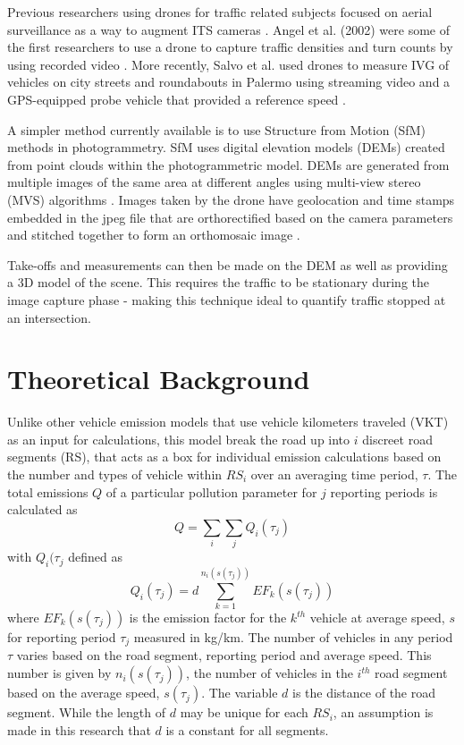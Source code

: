\documentclass[preprint,12pt,a4paper,authoryear]{elsarticle}
\begin{document}
\begin{linenumbers}
Previous researchers using drones for traffic related subjects focused on aerial surveillance as a way to augment ITS cameras \citep{Liu2013, Barmpounakis2016}. Angel et al. (2002) were some of the first researchers to use a drone to capture traffic densities and turn counts by using recorded video \citep{Angel2002}. More recently, Salvo et al. used drones to measure IVG of vehicles on city streets and roundabouts in Palermo using streaming video and a GPS-equipped probe vehicle that provided a reference speed \citep{Salvo2014, Salvo2017}.

A simpler method currently available is to use Structure from Motion (SfM) methods in photogrammetry. SfM uses digital elevation models (DEMs) created from point clouds within the photogrammetric model. DEMs are generated from multiple images of the same area at different angles using multi-view stereo (MVS) algorithms \citep{James2017}. Images taken by the drone have geolocation and time stamps embedded in the jpeg file that are orthorectified based on the camera parameters and stitched together to form an orthomosaic image \citep{Westoby2012}.

Take-offs and measurements can then be made on the DEM as well as providing a 3D model of the scene. This requires the traffic to be stationary during the image capture phase - making this technique ideal to quantify traffic stopped at an intersection.


\section{Theoretical Background}

Unlike other vehicle emission models that use vehicle kilometers traveled (VKT) as an input for calculations, this model break the road up into $i$ discreet road segments (RS), that acts as a box for individual emission calculations based on the number and types of vehicle within $RS_{i}$ over an averaging time period, $\tau$.  The total emissions $Q$ of a particular pollution parameter for $j$ reporting periods is calculated as
%
\begin{equation}
\label{eq:totQ}
Q = \sum_{i} \sum_{j}Q_{i}(\tau_{j}) 
\end{equation}
%
\noindent
with $Q_{i}(\tau_{j}$ defined as
%
\begin{equation}
\label{eq:roadsegQ}
Q_{i}(\tau_{j}) = d\sum_{k=1}^{n_{i}(s(\tau_{j}))} EF_{k}(s(\tau_{j}))
\end{equation}
%
\noindent
where $EF_{k}(s(\tau_j))$ is the emission factor for the $k^{th}$ vehicle at average speed, $s$ for reporting period $\tau_{j}$ measured in kg/km.  The number of vehicles in any period $\tau$ varies based on the road segment, reporting period and average speed. This number is given by $n_{i}(s(\tau_{j}))$, the number of vehicles in the $i^{th}$ road segment based on the average speed, $s(\tau_{j})$. The variable $d$ is the distance of the road segment. While the length of $d$ may be unique for each $RS_{i}$, an assumption is made in this research that $d$ is a constant for all segments.


\end{linenumbers}
\end{document}
